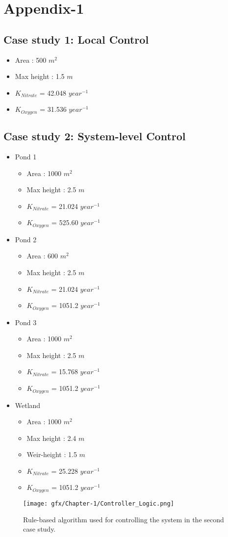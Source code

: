 \chapter{Appendix-1}\label{Appendix-1}
\section{Case study 1: Local Control}
\begin{itemize}
  \item Area : 500 $m^2$
  \item Max height : 1.5 $m$
  \item $K_{Nitrate}$ = 42.048 $year^{-1}$
  \item $K_{Oxygen}$ =  31.536 $year^{-1}$
\end{itemize} 
\section{Case study 2: System-level Control}
\begin{itemize}
\item Pond 1 
\begin{itemize}    
  \item Area : 1000 $m^2$
  \item Max height : 2.5 $m$
  \item $K_{Nitrate}$ = 21.024 $year^{-1}$
  \item $K_{Oxygen}$ = 525.60 $year^{-1}$
\end{itemize}
\item Pond 2  
\begin{itemize}
  \item Area : 600 $m^2$
  \item Max height : 2.5 $m$
  \item $K_{Nitrate}$ = 21.024 $year^{-1}$
  \item $K_{Oxygen}$ = 1051.2 $year^{-1}$
\end{itemize}
\item Pond 3 
\begin{itemize}
  \item Area : 1000 $m^2$
  \item Max height : 2.5 $m$
  \item $K_{Nitrate}$ = 15.768 $year^{-1}$
  \item $K_{Oxygen}$ = 1051.2 $year^{-1}$
\end{itemize}
\item Wetland  
\begin{itemize}
  \item Area : 1000 $m^2$
  \item Max height : 2.4 $m$
  \item Weir-height : 1.5 $m$ 
  \item $K_{Nitrate}$ = 25.228 $year^{-1}$
  \item $K_{Oxygen}$ = 1051.2 $year^{-1}$
\end{itemize}
\end{itemize}

\begin{figure}[!ht]
  \texttt{[image: gfx/Chapter-1/Controller\_Logic.png]}
  \caption{Rule-based algorithm used for controlling the system in the second case study.}\label{fgr:sys_logic}
\end{figure}
